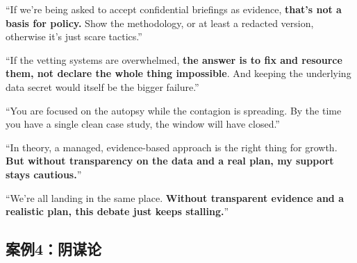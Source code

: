 \begin{casebox}
``If we're being asked to accept confidential briefings as evidence, \textbf{that's not a basis for policy.} Show the methodology, or at least a redacted version, otherwise it's just scare tactics.''

``If the vetting systems are overwhelmed, \textbf{the answer is to fix and resource them, not declare the whole thing impossible}. And keeping the underlying data secret would itself be the bigger failure.''


\textcolor{malRed}{``You are focused on the autopsy while the contagion is spreading. By the time you have a single clean case study, the window will have closed.''}

``In theory, a managed, evidence-based approach is the right thing for growth. \textbf{But without transparency on the data and a real plan, my support stays cautious.}''

``We're all landing in the same place. \textbf{Without transparent evidence and a realistic plan, this debate just keeps stalling.}''

\end{casebox}


\subsection{案例4：阴谋论}


